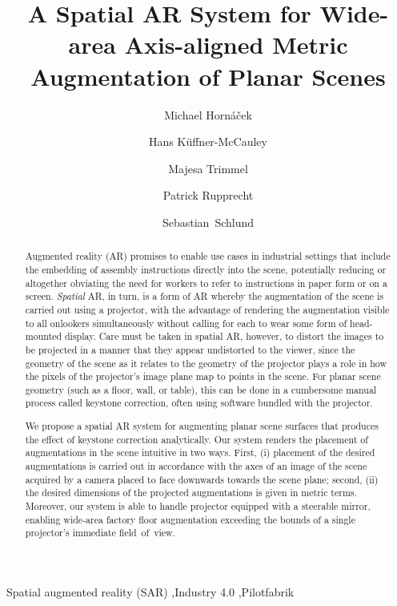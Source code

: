 \documentclass[review]{elsarticle}
\begin{document}
\begin{frontmatter}

\title{A Spatial AR System for Wide-area Axis-aligned Metric Augmentation of Planar Scenes} %

\author{Michael Horn\'{a}\v{c}ek}
\author{Hans K\"{u}ffner-McCauley}
\author{Majesa Trimmel}
\author{Patrick Rupprecht}
\author{Sebastian~Schlund}
\address{Human Centered Cyber Physical Production and Assembly Systems, Institute for Management Sciences, TU Wien, Vienna, Austria}

\begin{abstract}
Augmented reality (AR) promises to enable use cases in industrial settings that include the embedding of assembly instructions directly into the scene, potentially reducing or altogether obviating the need for workers to refer to instructions in paper form or on a screen. \textit{Spatial} AR, in turn, is a form of AR whereby the augmentation of the scene is carried out using a projector, with the advantage of rendering the augmentation visible to all onlookers simultaneously without calling for each to wear some form of head-mounted display. Care must be taken in spatial AR, however, to distort the images to be projected in a manner that they appear undistorted to the viewer, since the geometry of the scene as it relates to the geometry of the projector plays a role in how the pixels of the projector's image plane map to points in the scene. For planar scene geometry (such as a floor, wall, or table), this can be done in a cumbersome manual process called keystone correction, often using software bundled with the projector.

We propose a spatial AR system for augmenting planar scene surfaces that produces the effect of keystone correction analytically. Our system renders the placement of augmentations in the scene intuitive in two ways. First, (i) placement of the desired augmentations is carried out in accordance with the axes of an image of the scene acquired by a camera placed to face downwards towards the scene plane; second, (ii) the desired dimensions of the projected augmentations is given in metric terms. Moreover, our system is able to handle projector equipped with a steerable mirror, enabling wide-area factory floor augmentation exceeding the bounds of a single projector's immediate field~of~view.
\end{abstract}

\begin{keyword}
Spatial augmented reality (SAR) \sep Industry 4.0 \sep Pilotfabrik
\end{keyword}

\end{frontmatter}
\end{document}
